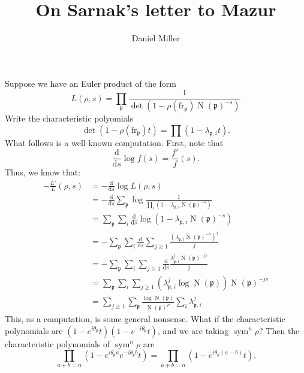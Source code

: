 \documentclass{article}
\title{On Sarnak's letter to Mazur}
\author{Daniel Miller}
\DeclareMathOperator{\norm}{N}
\DeclareMathOperator{\sym}{sym}
\newcommand{\fp}{\mathfrak{p}}
\newcommand{\dd}{\mathrm{d}}
\newcommand{\frob}{\mathrm{fr}}
\begin{document}
\maketitle





Suppose we have an Euler product of the form 
\[
	L(\rho,s) = \prod_\fp \frac{1}{\det(1-\rho(\frob_\fp) \norm (\fp)^{-s})}
\]
Write the characteristic polyomials 
\[
	\det(1-\rho(\frob_\fp) t) = \prod (1-\lambda_{\fp,i} t) .
\]
What follows is a well-known computation. First, note that 
\[
	\frac{\dd}{\dd s}\log f(s) = \frac{f'}{f}(s) .
\]
Thus, we know that: 
\begin{align*}
	-\frac{L'}{L}(\rho,s) 
		&= -\frac{\dd}{\dd s}\log L(\rho,s) \\
		&= -\frac{\dd}{\dd s} \sum_\fp \log \frac{1}{\prod_i (1-\lambda_{\fp,i} \norm(\fp)^{-s})} \\
		&= \sum_\fp \sum_i \frac{\dd}{\dd s} \log(1-\lambda_{\fp,i} \norm(\fp)^{-s}) \\
		&= -\sum_\fp \sum_i \frac{\dd}{\dd s} \sum_{j\geqslant 1} \frac{(\lambda_{\fp,i} \norm(\fp)^{-s})^j}{j} \\
		&= -\sum_\fp \sum_i \sum_{j\geqslant 1} \frac{\dd}{\dd s} \frac{\lambda_{\fp,i}^j \norm(\fp)^{-j s}}{j} \\
		&= \sum_\fp \sum_i \sum_{j\geqslant 1} (\lambda_{\fp,i}^j \log \norm(\fp)) \norm(\fp)^{-js} \\
		&= \sum_{j\geqslant 1} \sum_\fp \frac{\log \norm(\fp)}{\norm(\fp)^{j s}} \sum_i \lambda_{\fp,i}^j
\end{align*}
This, as a computation, is some general nonsense. What if the 
characteristic polynomials are $(1-e^{i\theta_\fp} t)(1-e^{-i\theta_\fp} t)$, 
and we are taking $\sym^n \rho$? Then the characteristic polynomials of 
$\sym^n\rho$ are 
\[
	\prod_{a+b=n} (1-e^{i \theta_\fp a} e^{-i\theta_\fp b} t)
		= \prod_{a+b=n} (1-e^{i\theta_\fp (a-b)} t) .
\]
\end{document}
